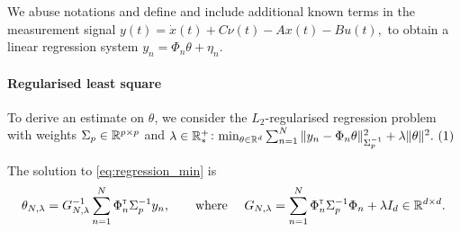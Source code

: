 \documentclass{article}
\begin{document}
We abuse notations and define and include additional known terms in the measurement signal
$
    y(t) = \dot{x}(t) + C\nu(t) - A x(t) - Bu(t),
$ 
to obtain a linear regression system
$
y_n = \Phi_n\theta + \eta_n.
$

\paragraph{Regularised least square} To derive an estimate on $\theta$, we consider the $L_2$-regularised regression problem with weights $\Sigma_p\in\mathbb{R}^{p\times p}$ and $\lambda\in\mathbb{R}^+_*$:\hfill
$
    \min_{\theta\in\Real^d} \sum_{n=1}^N \|y_n -\Phi_n\theta\|_{\Sigma_p^{-1}}^2 + \lambda\|\theta\|_{}^2.
    \refstepcounter{equation}~(\theequation)\label{eq:regression_min}
$



\begin{proposition}
\label{prop:regularized_solution}
The solution to \eqref{eq:regression_min} is
\begin{align}
    \label{eq:vector_rls}
    \theta_{N,\lambda} = G_{N, \lambda}^{-1} \sum_{n=1}^N \Phi_n^{\mathsf{\scriptscriptstyle T}} \Sigma_p^{-1} y_n,\qquad
    \text{where }\quad G_{N, \lambda} = \sum_{n=1}^N \Phi_{n}^{\mathsf{\scriptscriptstyle T}}\Sigma_p^{-1}\Phi_{n}  + \lambda I_d \in \mathbb{R}^{d\times d}.
\end{align}
\end{proposition}
\end{document}
